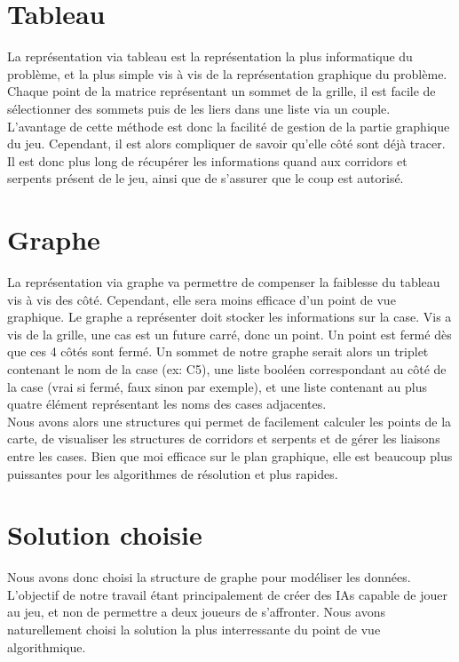 \documentclass[a4paper,12pt]{report}
\begin{document}
\section{Tableau}

La repr\'esentation via tableau est la repr\'esentation la plus informatique du probl\`eme, et la plus simple vis \`a vis de la repr\'esentation graphique du probl\`eme. Chaque point de la matrice repr\'esentant un sommet de la grille, il est facile de s\'electionner des sommets puis de les liers dans une liste via un couple.\\
L'avantage de cette m\'ethode est donc la facilit\'e de gestion de la partie graphique du jeu. Cependant, il est alors compliquer de savoir qu'elle c\^ot\'e sont d\'ej\`a tracer. Il est donc plus long de r\'ecup\'erer les informations quand aux corridors et serpents pr\'esent de le jeu, ainsi que de s'assurer que le coup est autoris\'e.

\section{Graphe}

La repr\'esentation via graphe va permettre de compenser la faiblesse du tableau vis \`a vis des c\^ot\'e. Cependant, elle sera moins efficace d'un point de vue graphique. Le graphe a repr\'esenter doit stocker les informations sur la case. Vis a vis de la grille, une cas est un future carr\'e, donc un point. Un point est ferm\'e d\`es que ces 4 c\^ot\'es sont ferm\'e. Un sommet de notre graphe serait alors un triplet contenant le nom de la case (ex: C5), une liste bool\'een correspondant au c\^ot\'e de la case (vrai si ferm\'e, faux sinon par exemple), et une liste contenant au plus quatre \'el\'ement repr\'esentant les noms des cases adjacentes. \\
Nous avons alors une structures qui permet de facilement calculer les points de la carte, de visualiser les structures de corridors et serpents et de g\'erer les liaisons entre les cases. Bien que moi efficace sur le plan graphique, elle est beaucoup plus puissantes pour les algorithmes de r\'esolution et plus rapides. 

\section{Solution choisie}

Nous avons donc choisi la structure de graphe pour mod\'eliser les donn\'ees. L'objectif de notre travail \'etant principalement de cr\'eer des IAs capable de jouer au jeu, et non de permettre a deux joueurs de s'affronter. Nous avons naturellement choisi la solution la plus interressante du point de vue algorithmique. 
\end{document}
